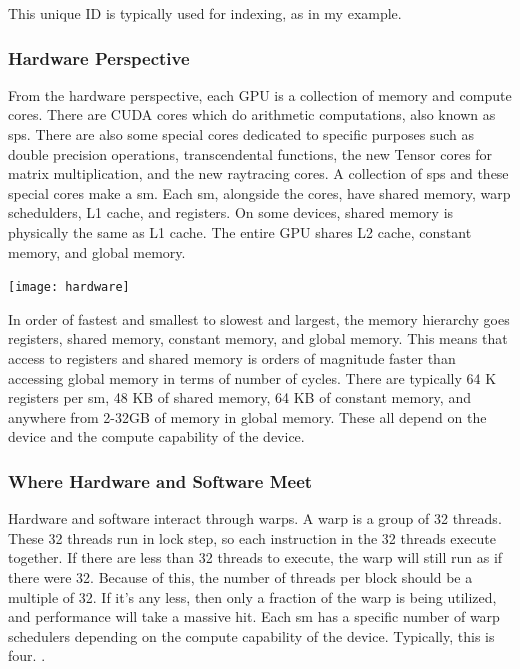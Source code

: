 This unique ID is typically used for indexing, as in my example.
\subsubsection{Hardware Perspective}
\indent From the hardware perspective, each GPU is a collection of memory and compute cores. There are CUDA cores which do arithmetic computations, also known as \glspl{sp}. There are also some special cores dedicated to specific purposes such as double precision operations, transcendental functions, the new Tensor cores for matrix multiplication, and the new raytracing cores. A collection of \glspl{sp} and these special cores make a \gls{sm}. Each \gls{sm}, alongside the cores, have shared memory, warp schedulders, L1 cache, and registers. On some devices, shared memory is physically the same as L1 cache. The entire GPU shares L2 cache, constant memory, and global memory.

\texttt{[image: hardware]}

In order of fastest and smallest to slowest and largest, the memory hierarchy goes registers, shared memory, constant memory, and global memory.  This means that access to registers and shared memory is orders of magnitude faster than accessing global memory in terms of number of cycles. There are typically 64 K registers per \gls{sm}, 48 KB of shared memory, 64 KB of constant memory, and anywhere from 2-32GB of memory in global memory. These all depend on the device and the compute capability of the device.

\subsubsection{Where Hardware and Software Meet}
\indent Hardware and software interact through warps. A warp is a group of 32 threads. These 32 threads run in lock step, so each instruction in the 32 threads execute together. If there are less than 32 threads to execute, the warp will still run as if there were 32. Because of this, the number of threads per block should be a multiple of 32. If it's any less, then only a fraction of the warp is being utilized, and performance will take a massive hit. Each \gls{sm} has a specific number of warp schedulers depending on the compute capability of the device. Typically, this is four.  \citep{cudaC}.

